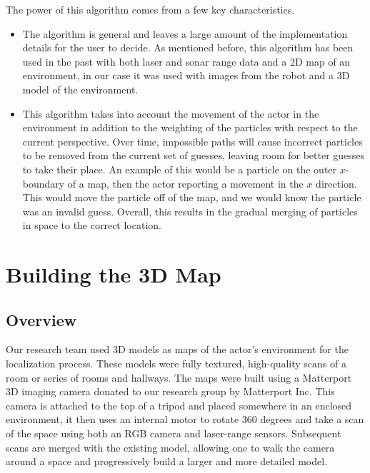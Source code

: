 \documentclass[a4paper,11pt]{article}
\begin{document}
 The power of this algorithm comes from a few key characteristics. 
\begin{itemize}
 \item The algorithm is general and leaves a large amount of the implementation details for the user to decide. As mentioned before, this algorithm has been used in the past with both laser and sonar range data and a 2D map of an environment, in our case it was used with images from the robot and a 3D model of the environment. 
 \item This algorithm takes into account the movement of the actor in the environment in addition to the weighting of the particles with respect to the current perspective. Over time, impossible paths will cause incorrect particles to be removed from the current set of guesses, leaving room for better guesses to take their place. An example of this would be a particle on the outer $x$-boundary of a map, then the actor reporting a movement in the $x$ direction. This would move the particle off of the map, and we would know the particle was an invalid guess. Overall, this results in the gradual merging of particles in space to the correct location.
\end{itemize}















  \section{Building the 3D Map}
   \subsection{Overview}
  Our research team used 3D models as maps of the actor's environment for the localization process. These models were fully textured, high-quality scans of a room or series of rooms and hallways. The maps were built using a Matterport 3D imaging camera donated to our research group by Matterport Inc. This camera is attached to the top of a tripod and placed somewhere in an enclosed environment, it then uses an internal motor to rotate 360 degrees and take a scan of the space using both an RGB camera and laser-range sensors. Subsequent scans are merged with the existing model, allowing one to walk the camera around a space and progressively build a larger and more detailed model.
\end{document}
